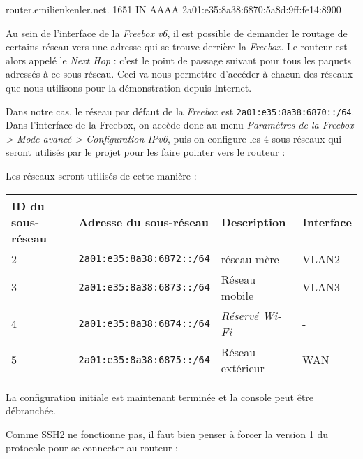 \begin{code}
router.emilienkenler.net. 1651  IN      AAAA    2a01:e35:8a38:6870:5a8d:9ff:fe14:8900
\end{code}

Au sein de l'interface de la \emph{Freebox v6}, il est possible de demander le routage de certains réseau vers une adresse qui se trouve derrière la \emph{Freebox}.
Le routeur est alors appelé le \emph{Next Hop} : c'est le point de passage suivant pour tous les paquets adressés à ce sous-réseau.
Ceci va nous permettre d'accéder à chacun des réseaux que nous utilisons pour la démonstration depuis Internet.

Dans notre cas, le réseau par défaut de la \emph{Freebox} est \texttt{2a01:e35:8a38:6870::/64}.
Dans l'interface de la Freebox, on accède donc au menu \emph{Paramètres de la Freebox > Mode avancé > Configuration IPv6}, puis on configure les 4 sous-réseaux qui seront utilisés par le projet pour les faire pointer vers le routeur :


Les réseaux seront utilisés de cette manière :

\begin{center}
    \begin{tabular}{|l|l|l|l|}
    \hline
    ID du sous-réseau & Adresse du sous-réseau           & Description                          & Interface \\ \hline
    2                 & \texttt{2a01:e35:8a38:6872::/64} & réseau mère                      & VLAN2     \\ \hline
    3                 & \texttt{2a01:e35:8a38:6873::/64} & Réseau mobile                        & VLAN3     \\ \hline
    4                 & \texttt{2a01:e35:8a38:6874::/64} & \emph{Réservé Wi-Fi}                       & -         \\ \hline
    5                 & \texttt{2a01:e35:8a38:6875::/64} & Réseau extérieur & WAN       \\ \hline
    \end{tabular}
\end{center}

La configuration initiale est maintenant terminée et la console peut être débranchée.

Comme SSH2 ne fonctionne pas, il faut bien penser à forcer la version 1 du protocole pour se connecter au routeur :



